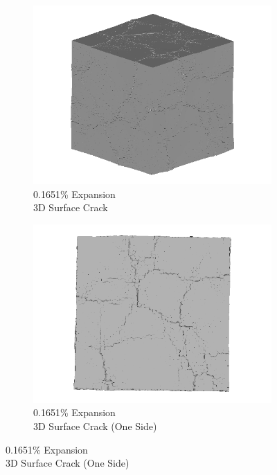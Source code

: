 \begin{figure}[ht!]
\centering
    \begin{subfigure}{.5\textwidth}
      \centering
      \includegraphics[width=0.5\linewidth]{Files/exp_3D/ASR/A30P25_1_3d.png}
      \caption{0.1651\% Expansion\\3D Surface Crack}
    \end{subfigure}%
    \begin{subfigure}{.5\textwidth}
      \centering
      \includegraphics[width=0.5\linewidth]{Files/exp_3D/ASR/A30P25_1_3ds.png}
      \caption{0.1651\% Expansion\\3D Surface Crack (One Side)}
    \end{subfigure}%


\end{figure}
